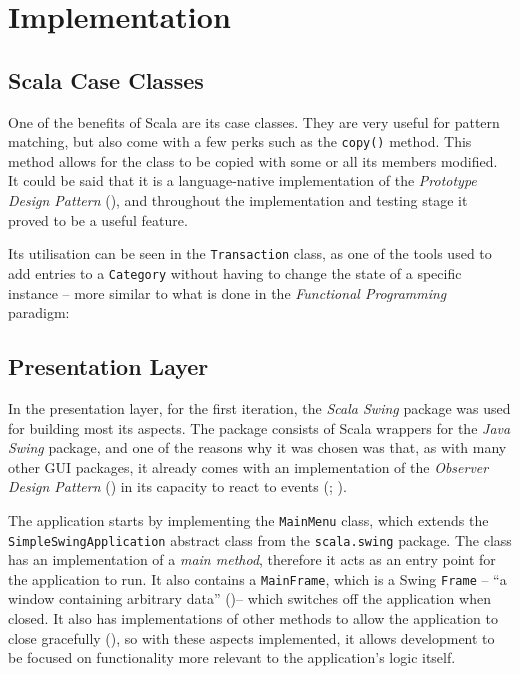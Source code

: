 \section{Implementation} \label{sec:Implementation}

\subsection{Scala Case Classes} \label{sec:Reflections.ScalaCaseClasses}
One of the benefits of Scala are its case classes. They are very useful for
pattern matching, but also come with a few perks such as the \texttt{copy()}
method. This method allows for the class to be copied with some or all its
members modified. It could be said that it is a language-native implementation
of the \emph{Prototype Design Pattern}
(\cite[][Ch.~6,~Location~2461]{nikolov2016scala}), and throughout the
implementation and testing stage it proved to be a useful feature.

Its utilisation can be seen in the \texttt{Transaction} class, as one of the
tools used to add entries to a \texttt{Category} without having to change the
state of a specific instance -- more similar to what is done in the
\emph{Functional Programming} paradigm:
{
  \small
  
}


\subsection{Presentation Layer} \label{sec:Implementation.Presentation}
In the presentation layer, for the first iteration, the \emph{Scala Swing}
package was used for building most its aspects. The package consists of Scala
wrappers for the \emph{Java Swing} package, and one of the reasons why it was
chosen was that, as with many other GUI packages, it already comes with an
implementation of the \emph{Observer Design Pattern}
(\cite[][]{gamma1995design}) in its capacity to react to events
(\cite[][p.~5]{maier2009scala};
\cite[][Ch.~9,~Location~3731]{nikolov2016scala}).

\begin{sloppypar}
  The application starts by implementing the \texttt{MainMenu} class, which
  extends the \texttt{SimpleSwingApplication} abstract class from the
  \texttt{scala.swing} package. The class has an implementation of a \emph{main
  method}, therefore it acts as an entry point for the application to run. It
  also contains a \texttt{MainFrame}, which is a Swing \texttt{Frame} -- ``a
  window containing arbitrary data''
  (\cite[][Ch.~34,~Section~34.1]{odersky2016scala})-- which switches off the
  application when closed. It also has implementations of other methods to
  allow the application to close gracefully
  (\cite[][p.~2~\&~3]{maier2009scala}), so with these aspects implemented, it
  allows development to be focused on functionality more relevant to the
  application's logic itself.
\end{sloppypar}


